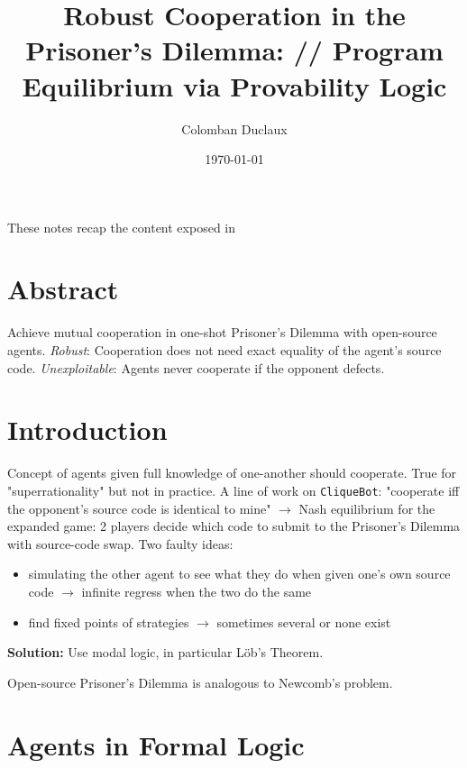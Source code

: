 \documentclass{article}
\title{Robust Cooperation in the Prisoner's Dilemma: //
Program Equilibrium via Provability Logic}
\author{Colomban Duclaux}
\date{\today}
\begin{document}
\maketitle
These notes recap the content exposed in \cite{barasz2021robustcooperationprisonersdilemma}

\section{Abstract}
Achieve mutual cooperation in one-shot Prisoner's Dilemma with open-source agents.
\textit{Robust}: Cooperation does not need exact equality of the agent's source code.
\textit{Unexploitable}: Agents never cooperate if the opponent defects.

\section{Introduction}
Concept of agents given full knowledge of one-another should cooperate. True for "superrationality" but not in practice. 
A line of work on \texttt{CliqueBot}: "cooperate iff the opponent's source code is identical to mine" $\to$ Nash equilibrium for the expanded game: 2 players decide which code to submit to the Prisoner's Dilemma with source-code swap.
Two faulty ideas: \begin{itemize}
    \item simulating the other agent to see what they do when given one's own source code $\to$ infinite regress when the two do the same
    \item find fixed points of strategies $\to$ sometimes several or none exist
\end{itemize}
\textbf{Solution:} Use modal logic, in particular Löb's Theorem.

Open-source Prisoner's Dilemma is analogous to Newcomb's problem.

\section{Agents in Formal Logic}
\printbibliography
\end{document}
